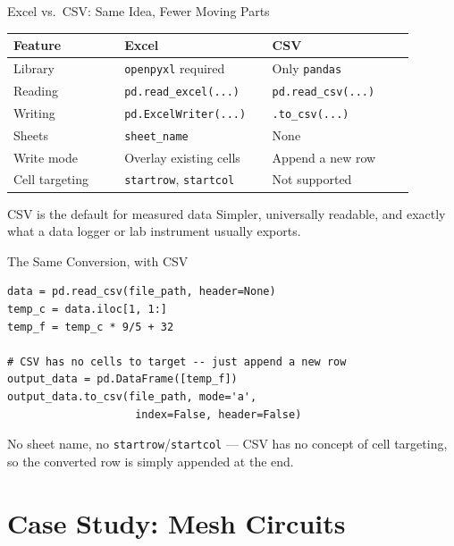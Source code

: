 \documentclass[9pt,aspectratio=169,xcolor=table]{beamer}
\newcommand{\striped}{\rowcolors{1}{white}{stripe}}
\begin{document}
\begin{frame}{Excel vs.\ CSV: Same Idea, Fewer Moving Parts}
    \leavevmode
    \small
    \striped
    \begin{tabular}{@{}p{0.25\linewidth}p{0.32\linewidth}p{0.32\linewidth}@{}}
        \toprule
        \textbf{Feature} & \textbf{Excel} & \textbf{CSV} \\
        \midrule
        Library & \texttt{openpyxl} required & Only \texttt{pandas} \\
        Reading & \texttt{pd.read\_excel(...)} & \texttt{pd.read\_csv(...)} \\
        Writing & \texttt{pd.ExcelWriter(...)} & \texttt{.to\_csv(...)} \\
        Sheets & \texttt{sheet\_name} & None \\
        Write mode & Overlay existing cells & Append a new row \\
        Cell targeting & \texttt{startrow}, \texttt{startcol} & Not supported \\
        \bottomrule
    \end{tabular}

    \vspace{3mm}
    \begin{alertblock}{CSV is the default for measured data}
        Simpler, universally readable, and exactly what a data
        logger or lab instrument usually exports.
    \end{alertblock}
\end{frame}

\begin{frame}[fragile]{The Same Conversion, with CSV}
    \leavevmode
\begin{lstlisting}
data = pd.read_csv(file_path, header=None)
temp_c = data.iloc[1, 1:]
temp_f = temp_c * 9/5 + 32

# CSV has no cells to target -- just append a new row
output_data = pd.DataFrame([temp_f])
output_data.to_csv(file_path, mode='a',
                    index=False, header=False)
\end{lstlisting}

    \vspace{2mm}
    {\small No sheet name, no \texttt{startrow}/\texttt{startcol} ---
    CSV has no concept of cell targeting, so the converted row is
    simply appended at the end.}
\end{frame}

\section{Case Study: Mesh Circuits}
\end{document}

